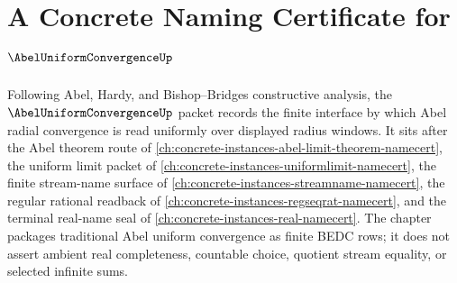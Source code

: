 \chapter{A Concrete Naming Certificate for $\AbelUniformConvergenceUp$}
\label{ch:concrete-instances-abel-uniform-convergence-namecert}

Following Abel, Hardy, and Bishop--Bridges constructive analysis, the $\AbelUniformConvergenceUp$ packet records the finite interface by which Abel radial convergence is read uniformly over displayed radius windows. It sits after the Abel theorem route of \autoref{ch:concrete-instances-abel-limit-theorem-namecert}, the uniform limit packet of \autoref{ch:concrete-instances-uniformlimit-namecert}, the finite stream-name surface of \autoref{ch:concrete-instances-streamname-namecert}, the regular rational readback of \autoref{ch:concrete-instances-regseqrat-namecert}, and the terminal real-name seal of \autoref{ch:concrete-instances-real-namecert}. The chapter packages traditional Abel uniform convergence as finite BEDC rows; it does not assert ambient real completeness, countable choice, quotient stream equality, or selected infinite sums.

